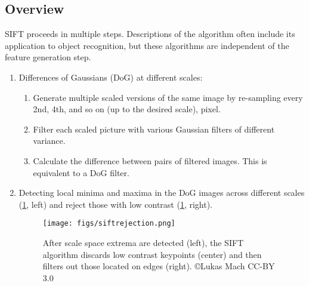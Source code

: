 \subsection{Overview}
SIFT proceeds in multiple steps. Descriptions of the algorithm often include its application to object recognition, but these algorithms are independent of the feature generation step.

\begin{enumerate}
\item Differences of Gaussians (DoG) at different scales:
\begin{enumerate}
\item Generate multiple scaled versions of the same image by re-sampling every 2nd, 4th, and so on (up to the desired scale), pixel.
\item Filter each scaled picture with various Gaussian filters of different variance.
\item Calculate the difference between pairs of filtered images. This is equivalent to a DoG filter.
\end{enumerate}

\item Detecting local minima and maxima in the DoG images across different scales (\cref{fig:siftrejection}, left) and reject those with low contrast (\cref{fig:siftrejection}, right).

\begin{figure}
	\centering
	\texttt{[image: figs/siftrejection.png]}
	\caption{After scale space extrema are detected (left), the SIFT algorithm discards low contrast keypoints (center) and then filters out those located on edges (right). \copyright Lukas Mach CC-BY 3.0}
	\label{fig:siftrejection}
\end{figure}


\end{enumerate}
